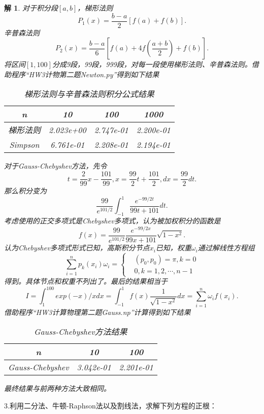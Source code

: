\documentclass[10pt]{ctexart}
\newtheorem*{solution}{解}
\begin{document}
\begin{solution}
    对于积分段$[a,b]$，梯形法则
    $$P_1(x)=\frac{b-a}{2}[f(a)+f(b)].$$
    辛普森法则
    $$P_2(x)=\frac{b-a}{6}\left[f(a)+4f\left(\frac{a+b}{2}\right)+f(b)\right].$$
    将区间$[1,100]$分成9段，99段，999段，对每一段使用梯形法则、辛普森法则。借助程序“HW3计物第二题Newton.py”得到如下结果
    \begin{table}[H]
        \centering
        \begin{tabular}{cccc}
            \toprule
            n & 10 & 100 & 1000\\
            \midrule
            梯形法则 & 2.023e+00 & 2.747e-01 & 2.200e-01\\
            Simpson & 6.761e-01 & 2.208e-01 & 2.194e-01\\
            \bottomrule
        \end{tabular}
        \caption{梯形法则与辛普森法则积分公式结果}
    \end{table}
    对于Gauss-Chebyshev方法，先令
    $$t=\frac{2}{99}x-\frac{101}{99},x=\frac{99}{2}t+\frac{101}{2},dx=\frac{99}{2}dt.$$
    那么积分变为
    $$\frac{99}{e^{101/2}}\int_{-1}^{1}\frac{e^{-99/2t}}{99t+101}dt.$$
    考虑使用的正交多项式是Chebyshev多项式，认为被加权积分的函数是
    $$f(x)=\frac{99}{e^{101/2}}\frac{e^{-99/2x}}{99x+101}\sqrt{1-x^2}.$$
    认为Chebyshev多项式形式已知，高斯积分节点$x_i$已知，权重$\omega_i$通过解线性方程组
    $$\sum\limits_{i=1}^{n}p_k(x_i)\omega_i=\left\{
        \begin{align}
            &(p_0,p_0)=\pi,k=0\\
            &0,k=1,2,\cdots,n-1
        \end{align}
        \right.$$
    得到。具体节点和权重不列出了。最后的结果相当于
    $$I=\int_{1}^{100}exp(-x)/xdx=\int_{-1}^{1}f(x)\frac{1}{\sqrt{1-x^2}}dx=\sum\limits_{i=1}^{n}\omega_{i}f(x_i).$$
    借助程序“HW3计算物理第二题Gauss.np”计算得到如下结果
    \begin{table}[H]
        \centering
        \begin{tabular}{ccc}
            \toprule
            n & 10 & 100\\
            \midrule
            Gauss-Chebyshev & 3.042e-01 & 2.201e-01\\
            \bottomrule
        \end{tabular}
        \caption{Gauss-Chebyshev方法结果}
    \end{table}
    最终结果与前两种方法大致相同。
\end{solution}
3.利用二分法、牛顿-Raphson法以及割线法，求解下列方程的正根：
\end{document}
